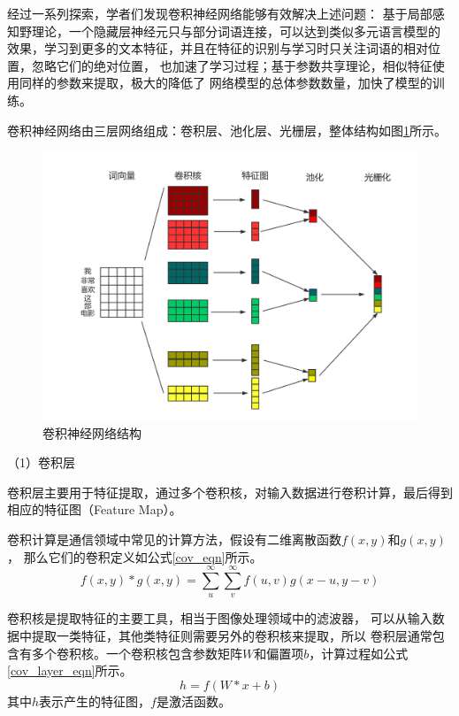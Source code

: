 \documentclass{standalone}
\begin{document}
经过一系列探索，学者们发现卷积神经网络能够有效解决上述问题：
基于局部感知野理论，一个隐藏层神经元只与部分词语连接，可以达到类似多元语言模型的
效果，学习到更多的文本特征，并且在特征的识别与学习时只关注词语的相对位置，忽略它们的绝对位置，
也加速了学习过程；基于参数共享理论，相似特征使用同样的参数来提取，极大的降低了
网络模型的总体参数数量，加快了模型的训练。



卷积神经网络由三层网络组成：卷积层、池化层、光栅层，整体结构如图\ref{Text_CNN}所示。
\begin{figure}[h]
    \includegraphics[scale=0.4]{picture/Text_CNN.png}
    \caption{卷积神经网络结构}
    \label{Text_CNN}
\end{figure}

（1）卷积层

卷积层主要用于特征提取，通过多个卷积核，对输入数据进行卷积计算，最后得到相应的特征图（Feature Map）。

卷积计算是通信领域中常见的计算方法，假设有二维离散函数$f\left ( x,y \right )$和$g\left ( x,y \right )$，
那么它们的卷积定义如公式\ref{cov_eqn}所示。
\begin{equation}
    f\left ( x,y \right )\ast g\left ( x,y \right )=\sum_{u}^{\infty }\sum_{v}^{\infty }f\left ( u,v \right )
g\left ( x-u,y-v \right )
    \label{cov_eqn}
\end{equation}

卷积核是提取特征的主要工具，相当于图像处理领域中的滤波器，
可以从输入数据中提取一类特征，其他类特征则需要另外的卷积核来提取，所以
卷积层通常包含有多个卷积核。一个卷积核包含参数矩阵$W$和偏置项$b$，计算过程如公式\ref{cov_layer_eqn}所示。
\begin{equation}
    h=f\left ( W\ast x+b \right )
    \label{cov_layer_eqn}
\end{equation}
其中$h$表示产生的特征图，$f$是激活函数。
\end{document}
